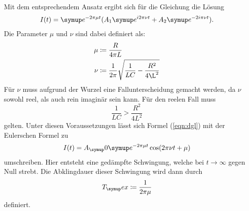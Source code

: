 Mit dem entsprechendem Ansatz ergibt sich für die Gleichung die Lösung
\begin{equation}
  I(t)=\su{e}^{-2\pi\mu t}(A_1\su{e}^{i2\pi\nu t} + A_2\su{e}^{-2i\pi\nu t}).
  \label{eqn:dgl}
\end{equation}
Die Parameter $\mu$ und $\nu$ sind dabei definiert als:
\begin{align*}
  \mu &\coloneqq\frac{R}{4\pi L} \\
  \nu &\coloneqq\frac{1}{2\pi}\sqrt{\frac{1}{LC}-\frac{R^2}{4\L^2}}
\end{align*}
Für $\nu$ muss aufgrund der Wurzel eine Fallunterscheidung gemacht werden, da
$\nu$ sowohl reel, als auch rein imaginär sein kann.
Für den reelen Fall muss
\begin{equation*}
  \frac{1}{LC} > \frac{R^2}{4L^2}
\end{equation*}
gelten. Unter diesen Voraussetzungen lässt sich Formel (\ref{eqn:dgl}) mit der
Eulerschen Formel zu
\begin{equation}
  I(t)=A_\su{0}\su{e}^{-2\pi\mu t}\cos(2\pi\nu t+\mu)
\end{equation}
umschreiben. Hier entsteht eine gedämpfte Schwingung, welche bei
$t\rightarrow\infty$
gegen Null strebt. Die Abklingdauer dieser Schwingung wird dann durch
\begin{equation}
  T_\su{ex}\coloneqq\frac{1}{2\pi\mu}
\end{equation}
definiert.

